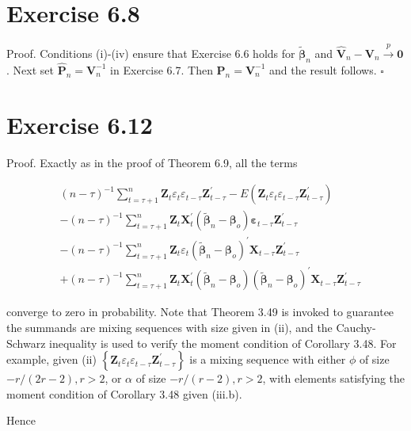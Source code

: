 \documentclass[10pt]{article}
\begin{document}
\section*{Exercise 6.8}
Proof. Conditions (i)-(iv) ensure that Exercise 6.6 holds for $\tilde{\boldsymbol{\beta}}_{n}$ and $\hat{\mathbf{V}}_{n}- \mathbf{V}_{n} \xrightarrow{p} \mathbf{0}$. Next set $\hat{\mathbf{P}}_{n}=\mathbf{V}_{n}^{-1}$ in Exercise 6.7. Then $\mathbf{P}_{n}=\mathbf{V}_{n}^{-1}$ and the result follows. \(\square\)

\section*{Exercise 6.12}
Proof. Exactly as in the proof of Theorem 6.9, all the terms

$$
\begin{aligned}
& (n-\tau)^{-1} \sum_{t=\tau+1}^{n} \mathbf{Z}_{t} \varepsilon_{t} \varepsilon_{t-\tau} \mathbf{Z}_{t-\tau}^{\prime}-E\left(\mathbf{Z}_{t} \varepsilon_{t} \varepsilon_{t-\tau} \mathbf{Z}_{t-\tau}^{\prime}\right) \\
& -(n-\tau)^{-1} \sum_{t=\tau+1}^{n} \mathbf{Z}_{t} \mathbf{X}_{t}^{\prime}\left(\tilde{\boldsymbol{\beta}}_{n}-\boldsymbol{\beta}_{o}\right) \boldsymbol{\varepsilon}_{t-\tau} \mathbf{Z}_{t-\tau}^{\prime} \\
& -(n-\tau)^{-1} \sum_{t=\tau+1}^{n} \mathbf{Z}_{t} \varepsilon_{t}\left(\tilde{\boldsymbol{\beta}}_{n}-\boldsymbol{\beta}_{o}\right)^{\prime} \mathbf{X}_{t-\tau} \mathbf{Z}_{t-\tau}^{\prime} \\
& +(n-\tau)^{-1} \sum_{t=\tau+1}^{n} \mathbf{Z}_{t} \mathbf{X}_{t}^{\prime}\left(\tilde{\boldsymbol{\beta}}_{n}-\boldsymbol{\beta}_{o}\right)\left(\tilde{\boldsymbol{\beta}}_{n}-\boldsymbol{\beta}_{o}\right)^{\prime} \mathbf{X}_{t-\tau} \mathbf{Z}_{t-\tau}^{\prime}
\end{aligned}
$$

converge to zero in probability. Note that Theorem 3.49 is invoked to guarantee the summands are mixing sequences with size given in (ii), and the Cauchy-Schwarz inequality is used to verify the moment condition of Corollary 3.48. For example, given (ii) $\left\{\mathbf{Z}_{t} \varepsilon_{t} \varepsilon_{t-\tau} \mathbf{Z}_{t-\tau}^{\prime}\right\}$ is a mixing sequence with either $\phi$ of size $-r /(2 r-2), r>2$, or $\alpha$ of size $-r /(r-2), r>2$, with elements satisfying the moment condition of Corollary 3.48 given (iii.b).

Hence
\end{document}
